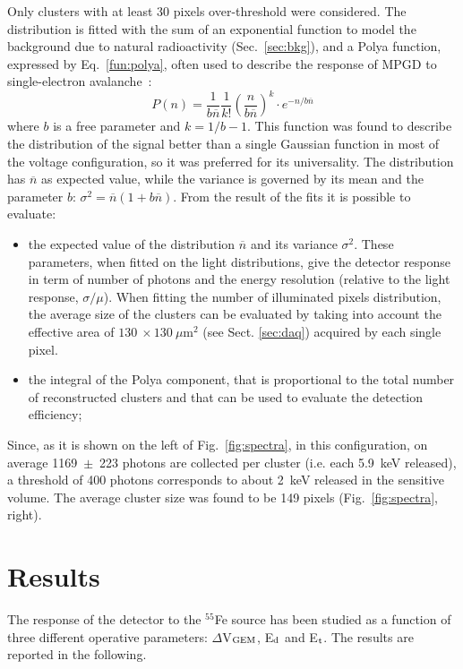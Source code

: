 \documentclass[a4paper]{jpconf}
\begin{document}
Only clusters with at least 30 pixels over-threshold were
considered. The distribution is fitted with the sum of an exponential
function to model the background due to natural radioactivity
(Sec.~\ref{sec:bkg}), and a Polya function, expressed by
Eq.~\ref{fun:polya}, often used to describe the response of MPGD to
single-electron avalanche~\cite{bib:rolandiblum}:
%
\begin{equation}
   P(n)=\frac{1}{b\overline{n}}\frac{1}{k!}\left(\frac{n}{b\overline{n}}\right)^k \cdot e^{-n/b\overline{n}}
\label{fun:polya}
\end{equation}
%
where $b$ is a free parameter and $k=1/b-1$. This function was found
to describe the distribution of the signal better than a single
Gaussian function in most of the voltage configuration, so it was
preferred for its universality. The distribution has $\overline{n}$ as
expected value, while the variance is governed by its mean and the
parameter $b$: $\sigma^2=\overline{n}(1+b\overline{n})$.  From the
result of the fits it is possible to evaluate:
\begin{itemize}
\item the expected value of the distribution $\overline{n}$ and its
  variance $\sigma^2$. These parameters, when fitted on the light
  distributions, give the detector response in term of number of
  photons and the energy resolution (relative to the light response,
  $\sigma/\mu$). When fitting the number of illuminated pixels
  distribution, the average size of the clusters can be evaluated by
  taking into account the effective area of $130~\times 130~\mu$m$^2$
  (see Sect. \ref{sec:daq}) acquired by each single pixel.
\item the integral of the Polya component, that is proportional to the
  total number of reconstructed clusters and that can be used to
  evaluate the detection efficiency;
\end{itemize}
Since, as it is shown on the left of Fig.~\ref{fig:spectra}, in this
configuration, on average 1169~$\pm$~223 photons are collected per cluster
(i.e. each 5.9~keV released), a threshold of 400 photons corresponds
to about 2~keV released in the sensitive volume.  The average cluster
size was found to be 149 pixels (Fig.~\ref{fig:spectra}, right).

\section{Results}
The response of the detector to the $^{55}$Fe source has been studied
as a function of three different operative parameters: $\Delta$V$_{\rm
  GEM}$, E$_{\rm d}$ and E$_{\rm t}$.  The results are reported in the
following.
\end{document}
